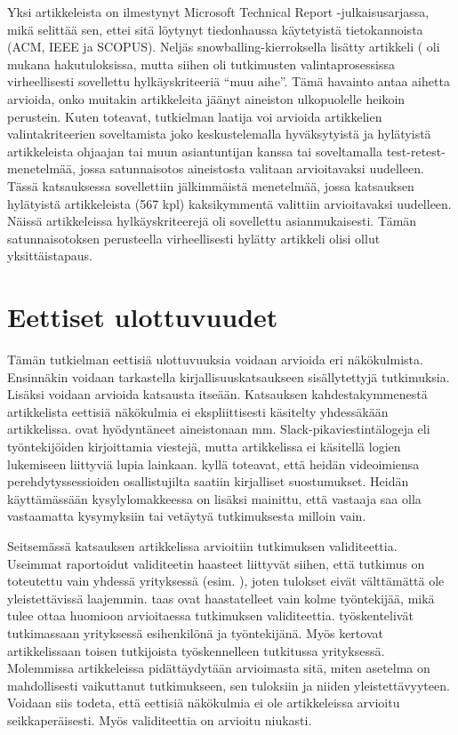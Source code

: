 \documentclass[utf8]{gradu3}
\begin{document}
Yksi artikkeleista \parencite{hemphill-begel-2011} on ilmestynyt Microsoft Technical Report -julkaisusarjassa, mikä selittää sen, ettei sitä löytynyt tiedonhaussa käytetyistä tietokannoista (ACM, IEEE ja SCOPUS). Neljäs snowballing-kierroksella lisätty artikkeli (\textcite{viviani-murphy-2019} oli mukana hakutuloksissa, mutta siihen oli tutkimusten valintaprosessissa virheellisesti sovellettu hylkäyskriteeriä ``muu aihe''. Tämä havainto antaa aihetta arvioida, onko muitakin artikkeleita jäänyt aineiston ulkopuolelle heikoin perustein. Kuten \textcite{kitchenham-charters-2007} toteavat, tutkielman laatija voi arvioida artikkelien valintakriteerien soveltamista joko keskustelemalla hyväksytyistä ja hylätyistä artikkeleista ohjaajan tai muun asiantuntijan kanssa tai soveltamalla test-retest-menetelmää, jossa satunnaisotos aineistosta valitaan arvioitavaksi uudelleen. Tässä katsauksessa sovellettiin jälkimmäistä menetelmää, jossa katsauksen hylätyistä artikkeleista (567 kpl) kaksikymmentä valittiin arvioitavaksi uudelleen. Näissä artikkeleissa hylkäyskriteerejä oli sovellettu asianmukaisesti. Tämän satunnaisotoksen perusteella virheellisesti hylätty artikkeli \parencite{viviani-murphy-2019} olisi ollut yksittäistapaus. 


\section{Eettiset ulottuvuudet}

Tämän tutkielman eettisiä ulottuvuuksia voidaan arvioida eri näkökulmista. Ensinnäkin voidaan tarkastella kirjallisuuskatsaukseen sisällytettyjä tutkimuksia. Lisäksi voidaan arvioida katsausta itseään. Katsauksen kahdestakymmenestä artikkelista eettisiä näkökulmia ei ekspliittisesti käsitelty yhdessäkään artikkelissa. \textcite{moe-ym-2020} ovat hyödyntäneet aineistonaan mm. Slack-pikaviestintälogeja eli työntekijöiden kirjoittamia viestejä, mutta artikkelissa ei käsitellä logien lukemiseen liittyviä lupia lainkaan. \textcite{yates-ym-2020} kyllä toteavat, että heidän videoimiensa perehdytyssessioiden osallistujilta saatiin kirjalliset suostumukset. Heidän käyttämässään kysylylomakkeessa on lisäksi mainittu, että vastaaja saa olla vastaamatta kysymyksiin tai vetäytyä tutkimuksesta milloin vain. 

Seitsemässä katsauksen artikkelissa arvioitiin tutkimuksen validiteettia. Useimmat raportoidut validiteetin haasteet liittyvät siihen, että tutkimus on toteutettu vain yhdessä yrityksessä (esim. \textcite{johnson-senges-2010}), joten tulokset eivät välttämättä ole yleistettävissä laajemmin. \textcite{viana-ym-2014} taas ovat haastatelleet vain kolme työntekijää, mikä tulee ottaa huomioon arvioitaessa tutkimuksen validiteettia. \textcite{hemphill-begel-2011} työskentelivät tutkimassaan yrityksessä esihenkilönä ja työntekijänä. Myös \textcite{kumar-wallace-2019} kertovat artikkelissaan toisen tutkijoista työskennelleen tutkitussa yrityksessä. Molemmissa artikkeleissa pidättäydytään arvioimasta sitä, miten asetelma on mahdollisesti vaikuttanut tutkimukseen, sen tuloksiin ja niiden yleistettävyyteen. Voidaan siis todeta, että eettisiä näkökulmia ei ole artikkeleissa arvioitu seikkaperäisesti. Myös validiteettia on arvioitu niukasti.
\end{document}
